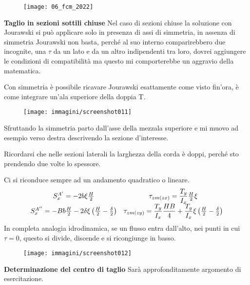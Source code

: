 \documentclass{article}
\begin{document}
\begin{figure}[H]
\texttt{[image: 06\_fcm\_2022]}
\end{figure}
\begin{adjustwidth}{2in}{}  

		\textbf{{\Large Taglio in sezioni sottili chiuse}} \newline
		Nel caso di sezioni chiuse la soluzione con Jourawski si può applicare solo in presenza di assi di simmetria, in assenza di simmetria Jourawski non basta, perché al suo interno comparirebbero due incognite, una $\tau$ da un lato e da un altro indipendenti tra loro, dovrei aggiungere le condizioni di compatibilità ma questo mi comporterebbe un aggravio della matematica. \newline
		
		Con simmetria è possibile ricavare Jourawski esattamente come visto fin'ora, è come integrare un'ala superiore della doppia T.  
		
\begin{figure}[H]
	\centering
	\texttt{[image: immagini/screenshot011]}
	\label{fig:screenshot011}
\end{figure}
		
		
		Sfruttando la simmetria parto dall'asse della mezzala superiore e mi muovo ad esempio verso destra descrivendo la sezione d'interesse. 
		
		Ricordarsi che nelle sezioni laterali la larghezza della corda è doppi, perché sto prendendo due volte lo spessore. 
		
		Ci si riconduce sempre ad un andamento quadratico o lineare.
        \[ \begin{matrix}
        	S_x^{A'}= -2b\xi{H\over 2} &
        		\tau_{zm(zx)} = \dfrac{T_y}{I_x}{H\over2}\xi \\
        		S_x^{A''}= -Bb{H\over 2} - 2\delta\xi\left({H\over 2} - {\delta\over2}\right) &
        		\tau_{zm(zy)}=  \dfrac{T_y}{I_x}\dfrac{HB}{4} + \dfrac{T_y}{I_x}\xi \left({H\over 2} - {\delta\over2}\right)
        \end{matrix} \]
    	In completa analogia idrodinamica, se un flusso entra dall'alto, nei punti in cui $\tau=0$, questo si divide, discende e si ricongiunge in basso. 
    	\begin{figure}[H]
    		\centering
    		\texttt{[image: immagini/screenshot012]}
    		\label{fig:screenshot012}
    	\end{figure}
    	 
    	\newpage
    	\textbf{{\Large Determinazione del centro di taglio}} \newline
    	Sarà approfonditamente argomento di esercitazione. \newline 
    	

\end{adjustwidth}
\end{document}
